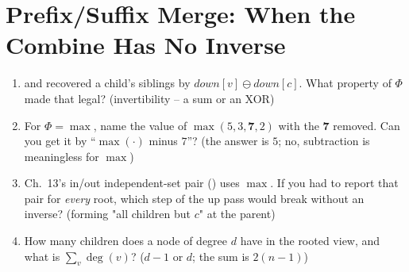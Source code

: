 \section{Prefix/Suffix Merge: When the Combine Has No Inverse}\label{sec:c20-prefixsuffix}

\begin{previouslybox}
\begin{enumerate}[nosep, leftmargin=1.6em]
  \item {} and  recovered a child's
        siblings by $\mathit{down}[v]\ominus\mathit{down}[c]$. What property of
        $\Phi$ made that legal? (invertibility -- a sum or an XOR)
  \item For $\Phi=\max$, name the value of $\max(5,3,\mathbf{7},2)$ with the
        $\mathbf{7}$ removed. Can you get it by ``$\max(\cdot)$ minus
        $7$''? (the answer is $5$; no, subtraction is meaningless for $\max$)
  \item Ch.~13's in/out independent-set pair () uses
        $\max$. If you had to report that pair for \emph{every} root, which
        step of the up pass would break without an inverse? (forming
        "all children but $c$" at the parent)
  \item How many children does a node of degree $d$ have in the rooted view,
        and what is $\sum_v \deg(v)$? ($d-1$ or $d$; the sum is $2(n-1)$)
\end{enumerate}
\end{previouslybox}

